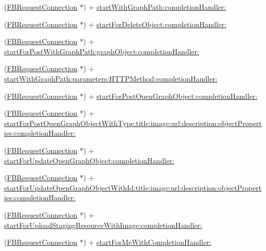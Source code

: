\begin{DoxyCompactItemize}
\item 
(\hyperlink{interfaceFBRequestConnection}{F\+B\+Request\+Connection} $\ast$) + \hyperlink{interfaceFBRequestConnection_ad5b57e64c614dcb04a71e62ee11a87d5}{start\+With\+Graph\+Path\+:completion\+Handler\+:}
\item 
(\hyperlink{interfaceFBRequestConnection}{F\+B\+Request\+Connection} $\ast$) + \hyperlink{interfaceFBRequestConnection_a3fc3ae420d8e47fd0b7a6b915622c527}{start\+For\+Delete\+Object\+:completion\+Handler\+:}
\item 
(\hyperlink{interfaceFBRequestConnection}{F\+B\+Request\+Connection} $\ast$) + \hyperlink{interfaceFBRequestConnection_ac79fe3711cf5a9dd8a9dde04638ca255}{start\+For\+Post\+With\+Graph\+Path\+:graph\+Object\+:completion\+Handler\+:}
\item 
(\hyperlink{interfaceFBRequestConnection}{F\+B\+Request\+Connection} $\ast$) + \hyperlink{interfaceFBRequestConnection_aff0e9852584fcd2c81eb7f4751ef0ee2}{start\+With\+Graph\+Path\+:parameters\+:\+H\+T\+T\+P\+Method\+:completion\+Handler\+:}
\item 
(\hyperlink{interfaceFBRequestConnection}{F\+B\+Request\+Connection} $\ast$) + \hyperlink{interfaceFBRequestConnection_aa592bef80bf5a2450be91fc9538b65bd}{start\+For\+Post\+Open\+Graph\+Object\+:completion\+Handler\+:}
\item 
(\hyperlink{interfaceFBRequestConnection}{F\+B\+Request\+Connection} $\ast$) + \hyperlink{interfaceFBRequestConnection_a98c88d095d77cc16d000fb9ce51d39e1}{start\+For\+Post\+Open\+Graph\+Object\+With\+Type\+:title\+:image\+:url\+:description\+:object\+Properties\+:completion\+Handler\+:}
\item 
(\hyperlink{interfaceFBRequestConnection}{F\+B\+Request\+Connection} $\ast$) + \hyperlink{interfaceFBRequestConnection_a481c4621f12410a7f6bbc7a0ccd6890b}{start\+For\+Update\+Open\+Graph\+Object\+:completion\+Handler\+:}
\item 
(\hyperlink{interfaceFBRequestConnection}{F\+B\+Request\+Connection} $\ast$) + \hyperlink{interfaceFBRequestConnection_ab5cf9ca8b5ab176a3d46fdf8db08ddf8}{start\+For\+Update\+Open\+Graph\+Object\+With\+Id\+:title\+:image\+:url\+:description\+:object\+Properties\+:completion\+Handler\+:}
\item 
(\hyperlink{interfaceFBRequestConnection}{F\+B\+Request\+Connection} $\ast$) + \hyperlink{interfaceFBRequestConnection_a930bc2fc6bfff73c3d98d15e6c84a5f9}{start\+For\+Upload\+Staging\+Resource\+With\+Image\+:completion\+Handler\+:}
\item 
(\hyperlink{interfaceFBRequestConnection}{F\+B\+Request\+Connection} $\ast$) + \hyperlink{interfaceFBRequestConnection_a9d89090f947eacfdf441172f842f5bc8}{start\+For\+Me\+With\+Completion\+Handler\+:}

\end{DoxyCompactItemize}
